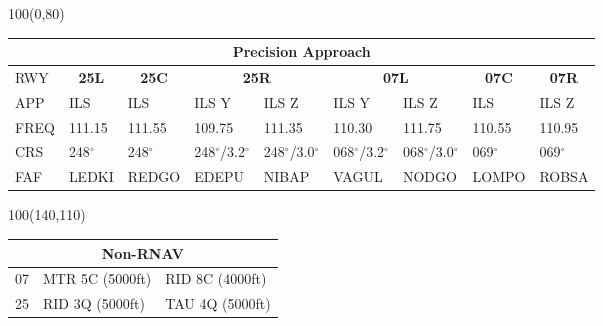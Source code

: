 \documentclass[10pt,landscape,a4paper]{article}
\begin{document}
\begin{textblock}{100}(0,80)
\begin{table}[]
\begin{tabular}{|l|l|l|l|l|l|l|l|l|}
\multicolumn{9}{c}{\textbf{Precision Approach}}                                                                                                                                                                            \\ \hline
RWY  & \multicolumn{1}{c|}{\textbf{25L}} & \multicolumn{1}{c|}{\textbf{25C}} & \multicolumn{2}{c|}{\textbf{25R}} & \multicolumn{2}{c|}{\textbf{07L}} & \multicolumn{1}{c|}{\textbf{07C}} & \multicolumn{1}{c|}{\textbf{07R}} \\ \hline
APP  & ILS                               & ILS                               & ILS Y           & ILS Z           & ILS Y           & ILS Z           & ILS                               & ILS Z                             \\
FREQ & 111.15                            & 111.55                            & 109.75          & 111.35          & 110.30          & 111.75          & 110.55                            & 110.95                            \\
CRS  & 248$^\circ$                              & 248$^\circ$                              & 248$^\circ$/3.2$^\circ$       & 248$^\circ$/3.0$^\circ$       & 068$^\circ$/3.2$^\circ$       & 068$^\circ$/3.0$^\circ$       & 069$^\circ$                              & 069$^\circ$                              \\
FAF  & LEDKI                             & REDGO                             & EDEPU           & NIBAP           & VAGUL           & NODGO           & LOMPO                             & ROBSA                             \\ \hline
\end{tabular}
\end{table}
\end{textblock}



\begin{textblock}{100}(140,110)
\begin{table}[]
\begin{tabular}{|l|l|l|}
\multicolumn{3}{c}{\textbf{Non-RNAV}} \\ \hline
07  & MTR 5C (5000ft)    & RID 8C (4000ft)   \\ \hline
25  & RID 3Q (5000ft)    & TAU 4Q (5000ft)   \\ \hline
\end{tabular}
\end{table}
\end{textblock}
\end{document}
